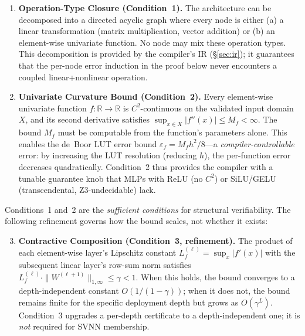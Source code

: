 \begin{enumerate}
    \item \textbf{Operation-Type Closure (Condition~1).} The architecture
    can be decomposed into a directed acyclic graph where every node is
    either (a) a linear transformation (matrix multiplication, vector
    addition) or (b) an element-wise univariate function. No node may
    mix these operation types. This decomposition is provided by the
    compiler's IR ({\S}\ref{sec:ir}); it guarantees that the per-node
    error induction in the proof below never encounters a coupled
    linear+nonlinear operation.

    \item \textbf{Univariate Curvature Bound (Condition~2).} Every element-wise
    univariate function $f: \mathbb{R} \to \mathbb{R}$ is $C^2$-continuous
    on the validated input domain $X$, and its second derivative satisfies
    $\sup_{x \in X} |f''(x)| \leq M_f < \infty$. The bound $M_f$ must be
    computable from the function's parameters alone. This enables the
    de~Boor LUT error bound $\varepsilon_f = M_f h^2/8$---a
    \textit{compiler-controllable} error: by increasing the LUT resolution
    (reducing $h$), the per-function error decreases quadratically.
    Condition~2 thus provides the compiler with a tunable guarantee knob
    that MLPs with ReLU (no $C^2$) or SiLU/GELU (transcendental,
    Z3-undecidable) lack.
\end{enumerate}

\noindent Conditions~1 and~2 are the \textit{sufficient conditions} for
structural verifiability. The following refinement governs how the bound
scales, not whether it exists:

\begin{enumerate}\setcounter{enumi}{2}
    \item \textbf{Contractive Composition (Condition~3, refinement).} The
    product of each element-wise layer's Lipschitz constant
    $L_f^{(\ell)} = \sup_x |f'(x)|$ with the subsequent linear layer's
    row-sum norm satisfies $L_f^{(\ell)} \cdot \|W^{(\ell+1)}\|_{1,\infty}
    \leq \gamma < 1$. When this holds, the bound converges to a
    depth-independent constant $O(1/(1-\gamma))$; when it does not, the
    bound remains finite for the specific deployment depth but grows as
    $O(\gamma^L)$. Condition~3 upgrades a per-depth certificate to a
    depth-independent one; it is \textit{not} required for SVNN membership.
\end{enumerate}

